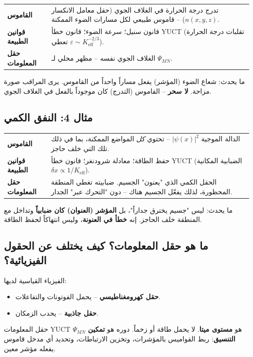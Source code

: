 \documentclass[11pt,a4paper]{article}
\begin{document}
	\begin{tabular}{p{2.8cm} p{10cm}}
		\textbf{القاموس} & تدرج درجة الحرارة في الغلاف الجوي (حقل معامل الانكسار \(n(x,y,z)\)) -- قاموس طبيعي لكل مسارات الضوء الممكنة. \\
		\textbf{قوانين الطبيعة} & قانون سنيل؛ سرعة الضوء؛ قانون خطأ YUCT (تقلبات درجة الحرارة تعطي \(\varepsilon \sim K_{\mathrm{eff}}^{-2/3}\)). \\
		\textbf{حقل المعلومات} & الغلاف الجوي نفسه -- مظهر محلي لـ \(\Psi_{MN}\). \\
	\end{tabular}
	
	\noindent ما يحدث: شعاع الضوء (المؤشر) يفعل مساراً واحداً من القاموس. يرى المراقب صورة مزاحة. \textbf{لا سحر} -- القاموس (التدرج) كان موجوداً بالفعل في الغلاف الجوي.
	
	\subsection{مثال 4: النفق الكمي}
	
	\begin{tabular}{p{2.8cm} p{10cm}}
		\textbf{القاموس} & الدالة الموجية \(|\psi(x)|^2\) -- تحتوي \emph{كل} المواضع الممكنة، بما في ذلك تلك التي خلف حاجز. \\
		\textbf{قوانين الطبيعة} & حفظ الطاقة؛ معادلة شرودنغر؛ قانون خطأ YUCT (الضبابية المكانية \(\delta x \propto 1/K_{\mathrm{eff}}\)). \\
		\textbf{حقل المعلومات} & الحقل الكمي الذي "يعنون" الجسيم. ضبابيته تغطي المنطقة المحظورة، لذلك يفعّل الجسيم هناك -- دون "التحرك عبر" الجدار. \\
	\end{tabular}
	
	\noindent ما يحدث: ليس "جسيم يخترق جداراً"، بل \textbf{المؤشر (العنوان) كان ضبابياً} وتداخل مع المنطقة خلف الحاجز. إنه \textbf{خطأ في العنونة}، وليس انتهاكاً لحفظ الطاقة.
	
	\subsection{ما هو حقل المعلومات؟ كيف يختلف عن الحقول الفيزيائية؟}
	
	الفيزياء القياسية لديها:
	\begin{itemize}
		\item \textbf{حقل كهرومغناطيسي} -- يحمل الفوتونات والتفاعلات.
		\item \textbf{حقل جاذبية} -- يحدب الزمكان.
	\end{itemize}
	حقل المعلومات YUCT \(\Psi_{MN}\) هو \textbf{مستوى ميتا}. لا يحمل طاقة أو زخماً. دوره هو \textbf{تمكين التنسيق}: ربط القواميس بالمؤشرات، وتخزين الارتباطات، وتحديد أي مدخل قاموس يفعله مؤشر معين.
	
\end{document}
